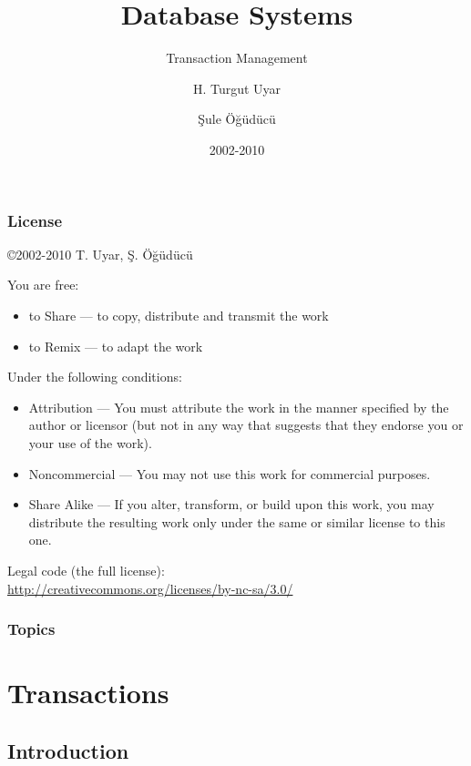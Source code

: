 \documentclass[dvipsnames]{beamer}
\title{Database Systems}
\subtitle{Transaction Management}
\author{H. Turgut Uyar \and Şule Öğüdücü}
\date{2002-2010}
\theoremstyle{plain}
\begin{document}
\begin{frame}
  \titlepage
\end{frame}

\begin{frame}
  \frametitle{License}

  \hfill
  \copyright 2002-2010 T. Uyar, Ş. Öğüdücü

  \vfill
  \begin{tiny}
    You are free:
    \begin{itemize}
      \item to Share — to copy, distribute and transmit the work
      \item to Remix — to adapt the work
    \end{itemize}

    Under the following conditions:
    \begin{itemize}
      \item Attribution — You must attribute the work in the manner specified by
        the author or licensor (but not in any way that suggests that they
        endorse you or your use of the work).

      \item Noncommercial — You may not use this work for commercial purposes.

      \item Share Alike — If you alter, transform, or build upon this work, you
        may distribute the resulting work only under the same or similar license
        to this one.
    \end{itemize}
  \end{tiny}

  \vfill
  Legal code (the full license):\\
  \url{http://creativecommons.org/licenses/by-nc-sa/3.0/}
\end{frame}

\begin{frame}
  \frametitle{Topics}
  \tableofcontents
\end{frame}

\section{Transactions}

\subsection{Introduction}
\end{document}

